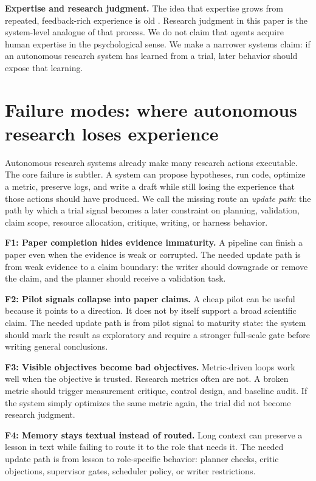 \documentclass{article}
\begin{document}
\textbf{Expertise and research judgment.}
The idea that expertise grows from repeated, feedback-rich experience is old \citep{Ericsson_1996}. Research judgment in this paper is the system-level analogue of that process. We do not claim that agents acquire human expertise in the psychological sense. We make a narrower systems claim: if an autonomous research system has learned from a trial, later behavior should expose that learning.

\section{Failure modes: where autonomous research loses experience}

Autonomous research systems already make many research actions executable. The core failure is subtler. A system can propose hypotheses, run code, optimize a metric, preserve logs, and write a draft while still losing the experience that those actions should have produced. We call the missing route an \emph{update path}: the path by which a trial signal becomes a later constraint on planning, validation, claim scope, resource allocation, critique, writing, or harness behavior.

\textbf{F1: Paper completion hides evidence immaturity.}
A pipeline can finish a paper even when the evidence is weak or corrupted. The needed update path is from weak evidence to a claim boundary: the writer should downgrade or remove the claim, and the planner should receive a validation task.

\textbf{F2: Pilot signals collapse into paper claims.}
A cheap pilot can be useful because it points to a direction. It does not by itself support a broad scientific claim. The needed update path is from pilot signal to maturity state: the system should mark the result as exploratory and require a stronger full-scale gate before writing general conclusions.

\textbf{F3: Visible objectives become bad objectives.}
Metric-driven loops work well when the objective is trusted. Research metrics often are not. A broken metric should trigger measurement critique, control design, and baseline audit. If the system simply optimizes the same metric again, the trial did not become research judgment.

\textbf{F4: Memory stays textual instead of routed.}
Long context can preserve a lesson in text while failing to route it to the role that needs it. The needed update path is from lesson to role-specific behavior: planner checks, critic objections, supervisor gates, scheduler policy, or writer restrictions.
\end{document}

